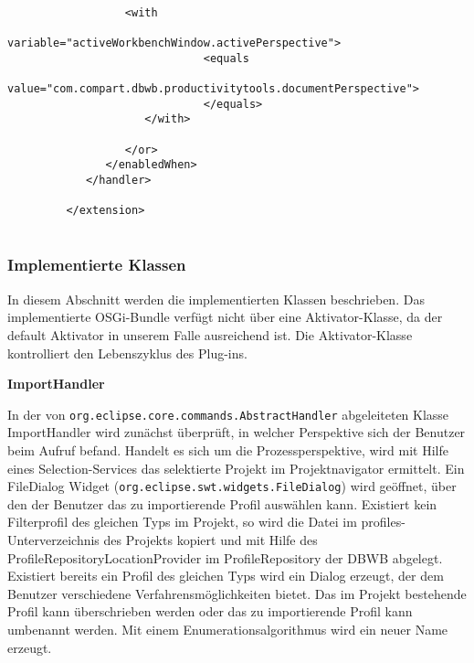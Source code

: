 {{{{\begin{lstlisting}[caption={Toolbar Extension},label=lst:extension]
                  
                  <with
                              variable="activeWorkbenchWindow.activePerspective">
                              <equals
                                    value="com.compart.dbwb.productivitytools.documentPerspective">
                              </equals>
                     </with>
                  
                  </or>
               </enabledWhen>
            </handler>
           
         </extension>
      
 \end{lstlisting}


}

\subsubsection{Implementierte Klassen}{
\label{sec:impl_klassen}

In diesem Abschnitt werden die implementierten Klassen beschrieben. Das implementierte OSGi-Bundle verfügt nicht über eine Aktivator-Klasse, da der default Aktivator in unserem Falle ausreichend ist.
Die Aktivator-Klasse kontrolliert den Lebenszyklus des Plug-ins. 

\textbf{ImportHandler}{

In der von \texttt{org.eclipse.core.commands.AbstractHandler} abgeleiteten Klasse ImportHandler wird zunächst überprüft, in welcher Perspektive sich der Benutzer beim Aufruf befand. Handelt es sich um die Prozessperspektive, wird mit Hilfe eines Selection-Services das selektierte Projekt im Projektnavigator ermittelt. Ein FileDialog Widget (\texttt{org.eclipse.swt.widgets.FileDialog}) wird geöffnet, über den der Benutzer das zu importierende Profil auswählen kann. Existiert kein Filterprofil des gleichen Typs im Projekt, so wird die Datei im profiles-Unterverzeichnis des Projekts kopiert und mit Hilfe des ProfileRepositoryLocationProvider im ProfileRepository der \ac {DBWB} abgelegt. Existiert bereits ein Profil des gleichen Typs wird ein Dialog erzeugt, der dem Benutzer verschiedene Verfahrensmöglichkeiten bietet. Das im Projekt bestehende Profil kann überschrieben werden oder das zu importierende Profil kann umbenannt werden. Mit einem Enumerationsalgorithmus wird ein neuer Name erzeugt.

 \begin{lstlisting}[caption={Nutzung eines Selection Services, um das gewähle Projekt zu ermitteln},label=lst:selectionService]
   

\end{lstlisting}}}}}}
